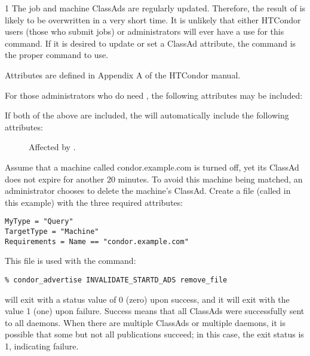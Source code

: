 \begin{ManPage}{\label{man-condor-advertise}}{1}
\GenRem
The job and machine ClassAds are regularly updated.
Therefore, the result of  is likely to be
overwritten in a very short time.
It is unlikely that either HTCondor users (those who submit jobs)
or administrators will ever have a use for this command.
If it is desired to update or set a ClassAd attribute, the
 command is the proper command to use.

Attributes are defined in Appendix A of the HTCondor manual.


For those administrators who do need , the following
attributes may be included:

\begin{description}
\item[]
\item[]
\end{description}

If both of the above are included, the  will
automatically include the following attributes:

\begin{description}
\item[]
\item[]
\item[]
\item[] Affected by .
\end{description}

\Examples

Assume that a machine called condor.example.com is turned off,
yet its  ClassAd does not expire for another 20 minutes.
To avoid this machine being matched, an administrator chooses
to delete the machine's  ClassAd.
Create a file (called  in this example)
with the three required attributes:
\begin{verbatim}
MyType = "Query"
TargetType = "Machine"
Requirements = Name == "condor.example.com"
\end{verbatim}

This file is used with the command:
\begin{verbatim}
% condor_advertise INVALIDATE_STARTD_ADS remove_file 
\end{verbatim}

\ExitStatus

 will exit with a status value of 0 (zero) upon
success, and it will exit with the value 1 (one) upon failure.
Success means that all ClassAds were successfully sent to all 
 daemons.
When there are multiple ClassAds or multiple  daemons,
it is possible that some but not all publications succeed;
in this case, the exit status is 1, indicating failure.

\end{ManPage}
